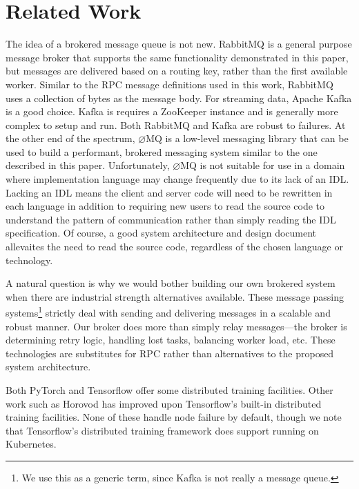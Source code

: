 \documentclass[conference]{IEEEtran}
\begin{document}
\section{Related Work}
The idea of a brokered message queue is not new. RabbitMQ \cite{rabbitmq} is a general
purpose message broker that supports the same functionality demonstrated
in this paper, but messages are delivered based on a routing key, rather than
the first available worker. Similar to the RPC message definitions used in
this work, RabbitMQ uses a collection of bytes as the message body. For
streaming data, Apache Kafka \cite{kafka} is a good choice. Kafka is requires a
ZooKeeper \cite{Hunt:2010:ZWC:1855840.1855851} instance and is generally
more complex to setup and run.
Both RabbitMQ and Kafka are robust to failures. At the other end of the
spectrum, $\varnothing$MQ is a low-level messaging library that can be used
to build a performant, brokered messaging system similar to the one described
in this paper. Unfortunately, $\varnothing$MQ is not suitable for use in a
domain where implementation language may change frequently due to its lack of
an IDL. Lacking an IDL means the client and server code will need to be rewritten
in each language in addition to requiring new users to read the source code to
understand the pattern of communication rather than simply reading the IDL
specification. Of course, a good system architecture and design document allevaites
the need to read the source code, regardless of the chosen language or technology.

A natural question is why we would bother building our
own brokered system when there are industrial strength alternatives
available. These message passing systems\footnote{We use this as a generic term,
  since Kafka is not really a message queue.} strictly deal with sending and
delivering messages in a scalable and robust manner. Our broker does more than
simply relay messages---the broker is determining retry logic, handling lost
tasks, balancing worker load, etc. These technologies are substitutes for RPC
rather than alternatives to the proposed system architecture.

Both PyTorch\cite{paszke2017automatic} and Tensorflow
\cite{tensorflow2015-whitepaper} offer some distributed training
facilities. Other work such as Horovod \cite{DBLP:journals/corr/abs-1802-05799}
has improved upon Tensorflow's built-in distributed training facilities. 
None of these handle node failure by default, though we note that Tensorflow's
distributed training framework does support running on Kubernetes.
\end{document}
